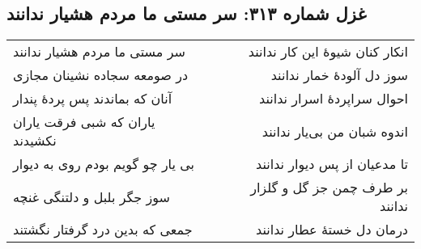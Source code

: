 \begin{center}
\section*{غزل شماره ۳۱۳: سر مستی ما مردم هشیار ندانند}
\label{sec:313}
\begin{longtable}{l p{0.5cm} r}
سر مستی ما مردم هشیار ندانند
&&
انکار کنان شیوهٔ این کار ندانند
\\
در صومعه سجاده نشینان مجازی
&&
سوز دل آلودهٔ خمار ندانند
\\
آنان که بماندند پس پردهٔ پندار
&&
احوال سراپردهٔ اسرار ندانند
\\
یاران که شبی فرقت یاران نکشیدند
&&
اندوه شبان من بی‌یار ندانند
\\
بی یار چو گویم بودم روی به دیوار
&&
تا مدعیان از پس دیوار ندانند
\\
سوز جگر بلبل و دلتنگی غنچه
&&
بر طرف چمن جز گل و گلزار ندانند
\\
جمعی که بدین درد گرفتار نگشتند
&&
درمان دل خستهٔ عطار ندانند
\\
\end{longtable}
\end{center}
